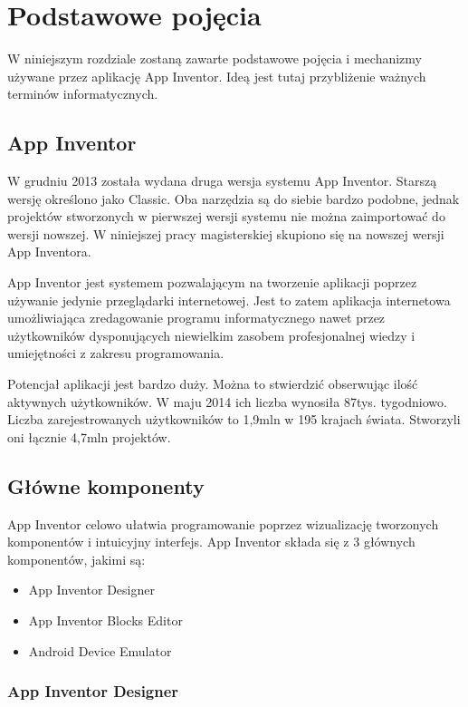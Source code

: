 \chapter{Podstawowe pojęcia}
\label{c2}

W niniejszym rozdziale zostaną zawarte podstawowe pojęcia i mechanizmy używane przez aplikację App Inventor. Ideą jest tutaj przybliżenie ważnych terminów informatycznych.

\section{App Inventor}
\label{c21}

W grudniu 2013 została wydana druga wersja systemu App Inventor. Starszą wersję określono jako Classic. Oba narzędzia są do siebie bardzo podobne, jednak projektów stworzonych w pierwszej wersji systemu nie można zaimportować do wersji nowszej. W niniejszej pracy magisterskiej skupiono się na nowszej wersji App Inventora. 

App Inventor jest systemem pozwalającym na tworzenie aplikacji poprzez używanie jedynie przeglądarki internetowej. Jest to zatem aplikacja internetowa umożliwiająca zredagowanie programu informatycznego nawet przez użytkowników dysponujących niewielkim zasobem profesjonalnej  wiedzy i umiejętności z zakresu programowania.  

Potencjał aplikacji jest bardzo duży. Można to stwierdzić obserwując ilość aktywnych użytkowników. W maju 2014 ich liczba wynosiła 87tys. tygodniowo. Liczba zarejestrowanych użytkowników to 1,9mln w 195 krajach świata. Stworzyli oni łącznie 4,7mln projektów.\cite{article:appinventor1}

\section{Główne komponenty}
\label{c22}

App Inventor celowo ułatwia programowanie poprzez wizualizację tworzonych komponentów i intuicyjny interfejs. App Inventor składa się z 3 głównych komponentów, jakimi są:
\begin{itemize}
\item App Inventor Designer
\item App Inventor Blocks Editor
\item Android Device Emulator
\end{itemize}

\subsection{App Inventor Designer}
\label{c221}

